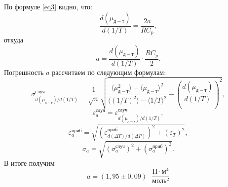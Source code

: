 \documentclass[a4paper, 12pt]{article}
\begin{document}
\begin{enumerate}
        По формуле \eqref{eq3} видно, что:
        \begin{equation}
            \frac{d(\mu_{д-т})}{d(1/T)} = \frac{2a}{R C_p},
        \end{equation}
        откуда
        \begin{equation}
            a = \frac{d(\mu_{д-т})}{d(1/T)} \cdot \frac{R C_p}{2}.
        \end{equation}
        Погрешность $a$ рассчитаем по следующим формулам:
        \begin{equation}
            \sigma_{d(\mu_{д-т})/d(1/T)}^{случ} = \frac{1}{\sqrt{n}} \sqrt{\frac{\langle \mu_{д-т}^2 \rangle - \langle \mu_{д-т} \rangle^2}{\langle (1/T)^2 \rangle - \langle 1/T \rangle^2} - \left( \frac{d(\mu_{д-т})}{d(1/T)} \right)^2},
        \end{equation}
        \begin{equation}
            \varepsilon_a^{случ} = \varepsilon_{d(\mu_{д-т})/d(1/T)}^{случ},
        \end{equation}
        \begin{equation}
            \varepsilon_a^{приб} = \sqrt{(\varepsilon_{d(\Delta T)/d(\Delta P)}^{приб})^2 + (\varepsilon_T)^2},
        \end{equation}
        \begin{equation}
            \sigma_a = \sqrt{(\sigma_a^{случ})^2 + (\sigma_a^{приб})^2}.
        \end{equation}
        В итоге получим
        \begin{equation}
            a = (1,95 \pm 0,09) \text{ } \frac{\text{Н} \cdot \text{м}^4}{\text{моль}^2}
        \end{equation}
        
        \newpage
        

\end{enumerate}
\end{document}
